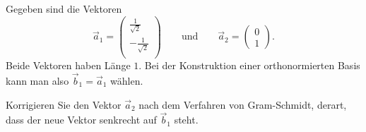 Gegeben sind die Vektoren
\[
\vec{a}_1
=
\begin{pmatrix}
 \frac{1}{\sqrt{2}}\\
-\frac{1}{\sqrt{2}}\\
\end{pmatrix}
\qquad\text{und}\qquad
\vec{a}_2
=
\begin{pmatrix}
0\\
1
\end{pmatrix}
.
\]
Beide Vektoren haben Länge $1$.
Bei der Konstruktion einer orthonormierten Basis kann man
also $\vec{b}_1=\vec{a}_1$ wählen.
\begin{teilaufgaben}
\item
Korrigieren Sie den Vektor $\vec{a}_2$ nach dem Verfahren von
Gram-Schmidt, derart, dass der neue Vektor senkrecht auf $\vec{b}_1$
steht.
\end{teilaufgaben}

